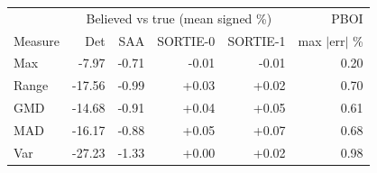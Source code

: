 \begin{tabular}{lrrrrr}\toprule
 & \multicolumn{4}{c}{Believed vs true (mean signed \%)} & PBOI \\
Measure & Det & SAA & SORTIE-0 & SORTIE-1 & max $|$err$|$ \% \\
\midrule
Max & -7.97 & -0.71 & -0.01 & -0.01 & 0.20 \\
Range & -17.56 & -0.99 & +0.03 & +0.02 & 0.70 \\
GMD & -14.68 & -0.91 & +0.04 & +0.05 & 0.61 \\
MAD & -16.17 & -0.88 & +0.05 & +0.07 & 0.68 \\
Var & -27.23 & -1.33 & +0.00 & +0.02 & 0.98 \\
\bottomrule
\end{tabular}

